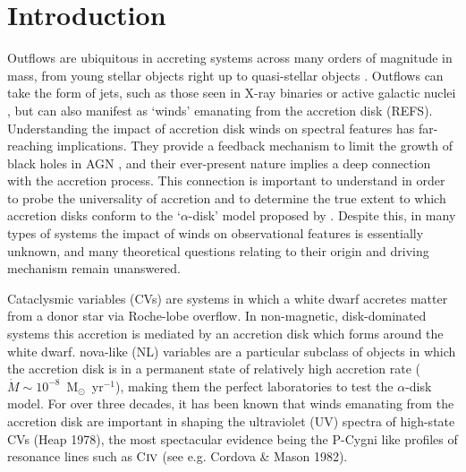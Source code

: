 \documentclass[preprint, a4paper, 11pt]{aastex}
\begin{document}
\maketitle


%
%

\section{Introduction} 

Outflows are ubiquitous  in accreting systems across many orders of magnitude in mass,
from young stellar objects \citep{bunn1995} right up 
to quasi-stellar objects \citep[QSOs;][]{ganguly2008}. Outflows can take the form of jets, such as those
seen in X-ray binaries \citep{fender2006} or active galactic nuclei \citep[AGN;][]{marscher2006}, 
but can also manifest as `winds' emanating from the accretion disk (REFS).
Understanding the impact of accretion disk winds on spectral features has far-reaching implications. 
They provide a feedback mechanism to limit the growth of black holes in AGN \citep{silkrees1998},
and their ever-present nature implies a deep connection with the accretion process. This connection
is important to understand in order to probe the universality of accretion \citep{mchardy2006, SKUK2012} 
and to determine the true extent to which
accretion disks conform to the `$\alpha$-disk' model proposed by 
\cite{shakurasunyaev1973}. 
Despite this, in many types of systems the impact of winds on observational
features is essentially unknown, and many theoretical questions relating to their origin 
and driving mechanism remain unanswered.

Cataclysmic variables (CVs) are systems in which a white dwarf accretes matter from a donor
star via Roche-lobe overflow. In non-magnetic, disk-dominated systems this accretion
is mediated by an accretion disk which forms around the white dwarf. 
nova-like (NL) variables are a particular subclass of objects in which the accretion disk
is in a permanent state of relatively high accretion rate 
($\dot{M} \sim 10^{-8}$~M$_{\odot}$~yr$^{-1}$),
making them the perfect laboratories to test the $\alpha$-disk model.
For over three decades, it has been known that winds emanating from the accretion disk
are important in shaping the ultraviolet (UV) spectra of high-state CVs (Heap 1978), 
the most spectacular evidence being the P-Cygni like profiles of resonance lines such as 
C${\textsc {iv}}$ (see e.g. Cordova \& Mason 1982\nocite{cordova1982}).
\end{document}
